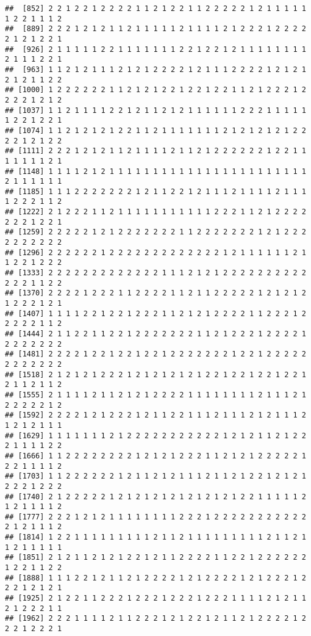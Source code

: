 \documentclass[
]{article}
\begin{document}
\begin{verbatim}
##  [852] 2 2 1 2 2 1 2 2 2 2 1 1 2 1 2 2 1 1 2 2 2 2 2 1 2 1 1 1 1 1 1 2 2 1 1 1 2
##  [889] 2 2 2 1 2 1 2 1 1 2 1 1 1 1 1 2 1 1 1 1 2 1 2 2 2 1 2 2 2 2 2 1 2 1 2 2 1
##  [926] 2 1 1 1 1 1 2 2 1 1 1 1 1 1 1 2 2 1 2 2 1 2 1 1 1 1 1 1 1 1 2 1 1 1 2 2 1
##  [963] 1 1 2 1 2 1 1 1 2 1 2 1 2 2 2 2 1 2 1 1 1 2 2 2 2 1 2 1 2 1 2 1 2 1 1 2 2
## [1000] 1 2 2 2 2 2 2 1 1 2 1 2 1 2 2 1 2 2 1 2 2 1 1 2 1 2 2 2 1 2 2 2 2 1 2 1 2
## [1037] 1 1 2 1 1 1 1 2 2 1 2 1 1 2 1 2 1 1 1 1 1 1 2 2 2 1 1 1 1 1 1 2 2 1 2 2 1
## [1074] 1 1 2 1 2 1 2 1 2 2 1 1 2 1 1 1 1 1 1 1 2 1 2 1 2 1 2 1 2 2 2 2 1 2 1 2 2
## [1111] 2 2 2 1 2 1 2 1 1 2 1 1 1 1 2 1 1 2 1 2 2 2 2 2 2 1 2 2 1 1 1 1 1 1 1 2 1
## [1148] 1 1 1 1 2 1 2 1 1 1 1 1 1 1 1 1 1 1 1 1 1 1 1 1 1 1 1 1 1 1 2 1 1 1 1 1 1
## [1185] 1 1 1 2 2 2 2 2 2 2 1 2 1 1 2 2 1 2 1 1 1 2 1 1 1 1 2 1 1 1 1 2 2 2 1 1 2
## [1222] 2 1 2 2 2 1 1 2 1 1 1 1 1 1 1 1 1 1 1 2 2 2 1 1 2 1 2 2 2 2 2 2 2 1 2 2 1
## [1259] 2 2 2 2 2 1 2 1 2 2 2 2 2 2 2 1 1 2 2 2 2 2 2 2 1 2 1 2 2 2 2 2 2 2 2 2 2
## [1296] 2 2 2 2 2 2 1 2 2 2 2 2 2 2 2 2 2 2 2 2 1 2 1 1 1 1 1 1 2 1 1 2 2 1 2 2 2
## [1333] 2 2 2 2 2 2 2 2 2 2 2 2 2 1 1 1 2 1 2 1 2 2 2 2 2 2 2 2 2 2 2 2 2 1 1 2 2
## [1370] 2 2 2 2 1 2 2 2 1 1 2 2 2 2 1 1 2 1 1 2 2 2 2 2 1 2 1 2 1 2 1 2 2 2 1 2 1
## [1407] 1 1 1 1 2 2 1 2 2 1 2 2 2 1 1 2 1 2 1 2 2 2 2 1 1 2 2 2 1 2 2 2 2 2 1 1 2
## [1444] 2 1 1 2 2 1 1 2 2 1 2 2 2 2 2 2 2 1 1 2 1 2 2 2 1 2 2 2 2 1 2 2 2 2 2 2 2
## [1481] 2 2 2 2 1 2 2 1 2 2 1 2 2 1 2 2 2 2 2 2 2 1 2 2 1 2 2 2 2 2 2 2 2 2 2 2 2
## [1518] 2 1 2 1 2 1 2 2 2 1 2 1 2 1 2 1 2 1 2 2 1 2 2 1 2 2 1 2 2 1 2 1 1 2 1 1 2
## [1555] 2 1 1 1 1 2 1 1 2 1 2 1 2 2 2 2 1 1 1 1 1 1 1 1 2 1 1 1 2 1 2 2 2 2 2 1 2
## [1592] 2 2 2 2 1 2 1 2 2 2 1 2 1 1 2 2 1 1 1 2 1 1 1 2 1 2 1 1 1 2 1 2 1 2 1 1 1
## [1629] 1 1 1 1 1 1 1 2 1 2 2 2 2 2 2 2 2 2 2 2 1 2 1 2 1 1 2 1 2 2 2 1 1 1 1 2 2
## [1666] 1 1 2 2 2 2 2 2 2 2 1 2 1 2 1 2 2 2 1 1 2 1 2 1 2 2 2 2 2 1 2 2 1 1 1 1 2
## [1703] 1 1 2 2 2 2 2 2 1 2 1 1 2 1 2 1 1 1 2 1 1 2 1 2 2 1 2 1 2 1 2 2 2 1 2 2 2
## [1740] 2 1 2 2 2 2 2 1 2 1 2 1 2 1 2 1 2 1 2 1 2 1 2 2 1 1 1 1 1 2 1 2 1 1 1 1 2
## [1777] 2 2 2 1 2 1 2 1 1 1 1 1 1 1 1 2 2 2 1 2 2 2 2 2 2 2 2 2 2 2 2 1 2 1 1 1 2
## [1814] 1 2 2 1 1 1 1 1 1 1 1 1 2 1 1 2 1 1 1 1 1 1 1 1 1 2 1 1 2 1 1 2 1 1 1 1 1
## [1851] 2 1 2 1 1 2 1 2 1 2 2 1 2 1 1 2 2 2 2 1 1 2 2 1 2 2 2 2 2 2 1 2 2 1 1 2 2
## [1888] 1 1 1 2 2 1 2 1 1 2 1 2 2 2 2 1 2 1 2 2 2 2 1 2 1 2 2 2 1 2 2 2 1 2 1 2 1
## [1925] 2 1 2 2 1 1 2 2 2 1 2 2 2 1 2 2 2 1 2 2 2 1 1 1 1 2 1 2 1 1 2 1 2 2 2 1 1
## [1962] 2 2 2 1 1 1 1 2 1 1 2 2 2 1 2 1 2 2 1 2 1 1 2 1 2 2 2 2 1 2 2 2 1 2 2 2 1

\end{verbatim}
\end{document}
